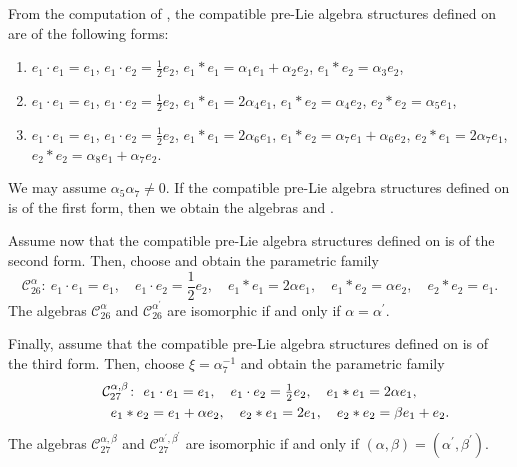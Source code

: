 \documentclass[pdftex]{sigma}
\numberwithin{equation}{section}
\begin{document}
From the computation of , the compatible pre-Lie
algebra structures defined on~ are of the following forms:
\begin{enumerate}\itemsep=0pt
\item[(1)] $e_{1}\cdot e_{1}=e_{1}$, $e_{1}\cdot e_{2}=\frac{1}{2}e_{2}$,
$e_{1}\ast e_{1}=\alpha _{1}e_{1}+\alpha _{2}e_{2}$, $e_{1}\ast
e_{2}=\alpha _{3}e_{2}$,

\item[(2)] $e_{1}\cdot e_{1}=e_{1}$, $e_{1}\cdot e_{2}=\frac{1}{2}e_{2}$,
$e_{1}\ast e_{1}=2\alpha _{4}e_{1}$, $e_{1}\ast e_{2}=\alpha _{4}e_{2}$,
$e_{2}\ast e_{2}=\alpha _{5}e_{1}$,

\item[(3)] $e_{1}\cdot e_{1}=e_{1}$, $e_{1}\cdot e_{2}=\frac{1}{2}e_{2}$,
$e_{1}\ast e_{1}=2\alpha _{6}e_{1}$, $e_{1}\ast e_{2}=\alpha
_{7}e_{1}+\alpha _{6}e_{2}$, $e_{2}\ast e_{1}=2\alpha _{7}e_{1}$, $%
e_{2}\ast e_{2}=\alpha _{8}e_{1}+\alpha _{7}e_{2}$.
\end{enumerate}

We may assume $\alpha _{5}\alpha _{7}\neq 0$.
If the compatible pre-Lie
algebra structures defined on  is of the
first form, then we obtain the algebras  and .

Assume now that the compatible pre-Lie algebra structures defined on  is of the second form. Then, choose  and obtain the parametric family
\[
\mathcal{C}_{26}^{\alpha } \colon \
e_{1}\cdot e_{1}=e_{1}, \quad e_{1}\cdot e_{2}=\frac{1}{2}e_{2}, \quad
e_{1}\ast e_{1}=2\alpha e_{1},\quad e_{1}\ast e_{2}=\alpha e_{2},\quad
e_{2}\ast e_{2}=e_{1}.
\]
The algebras $\mathcal{C}_{26}^{\alpha }$ and $\mathcal{C}_{26}^{\alpha ^{\prime
}}$ are isomorphic if and only if $\alpha =\alpha ^{\prime }$.

Finally, assume that the compatible pre-Lie algebra structures defined on \smash{$%
\mathcal{C}_{05}^{\frac{1}{2}}$} is of the third form. Then, choose $\xi =%
{\alpha^{-1} _{7}}$ and obtain the parametric family
\begin{gather*}
\mathcal{C}_{27}^{\alpha ,\beta } \colon \
e_{1}\cdot e_{1}=e_{1},\quad e_{1}\cdot e_{2}=\tfrac{1}{2}e_{2}, \quad
e_{1}\ast e_{1}=2\alpha e_{1}, \\
\hphantom{\mathcal{C}_{27}^{\alpha ,\beta } \colon} \ e_{1}\ast e_{2}=e_{1}+\alpha e_{2}, \quad
e_{2}\ast e_{1}=2e_{1},\quad e_{2}\ast e_{2}=\beta e_{1}+e_{2}.
\end{gather*}
The algebras $\mathcal{C}_{27}^{\alpha ,\beta }$ and $\mathcal{C}_{27}^{\alpha
^{\prime },\beta ^{\prime }}$ are isomorphic if and only if $(\alpha,\beta)= (\alpha^{\prime },\beta ^{\prime })$.
\end{document}
